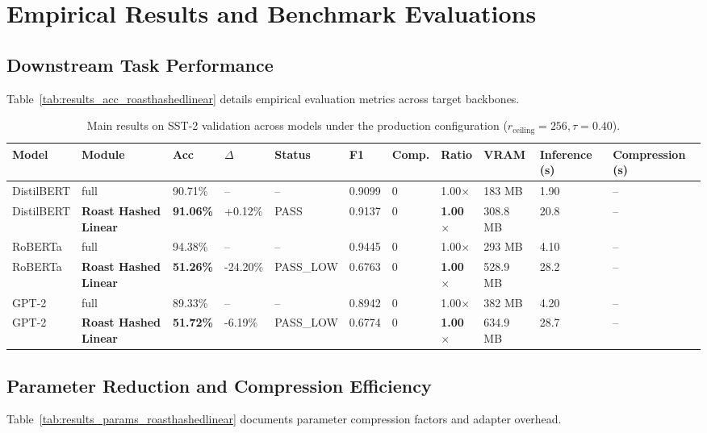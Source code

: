 \section{Empirical Results and Benchmark Evaluations}

\subsection{Downstream Task Performance}
Table~\ref{tab:results_acc_roasthashedlinear} details empirical evaluation metrics across target backbones.

\begin{table}[t]
\centering
\small
\begin{tabular}{lllllllllll}
\toprule
\textbf{Model} & \textbf{Module} & \textbf{Acc} & \textbf{$\Delta$} & \textbf{Status} & \textbf{F1} & \textbf{Comp.} & \textbf{Ratio} & \textbf{VRAM} & \textbf{Inference (s)} & \textbf{Compression (s)} \\
\midrule
DistilBERT & full & 90.71\% & -- & -- & 0.9099 & 0 & 1.00$\times$ & 183 MB & 1.90 & -- \\
DistilBERT & \textbf{Roast Hashed Linear} & \textbf{91.06\%} & +0.12\% & PASS & 0.9137 & 0 & \textbf{1.00$\times$} & 308.8 MB & 20.8 & -- \\
RoBERTa & full & 94.38\% & -- & -- & 0.9445 & 0 & 1.00$\times$ & 293 MB & 4.10 & -- \\
RoBERTa & \textbf{Roast Hashed Linear} & \textbf{51.26\%} & -24.20\% & PASS_LOW & 0.6763 & 0 & \textbf{1.00$\times$} & 528.9 MB & 28.2 & -- \\
GPT-2 & full & 89.33\% & -- & -- & 0.8942 & 0 & 1.00$\times$ & 382 MB & 4.20 & -- \\
GPT-2 & \textbf{Roast Hashed Linear} & \textbf{51.72\%} & -6.19\% & PASS_LOW & 0.6774 & 0 & \textbf{1.00$\times$} & 634.9 MB & 28.7 & -- \\
\bottomrule
\end{tabular}
\caption{Main results on SST-2 validation across models under the production configuration ($r_{\mathrm{ceiling}}=256, \tau=0.40$).}
\label{tab:main_sst2}
\end{table}

\subsection{Parameter Reduction and Compression Efficiency}
Table~\ref{tab:results_params_roasthashedlinear} documents parameter compression factors and adapter overhead.

